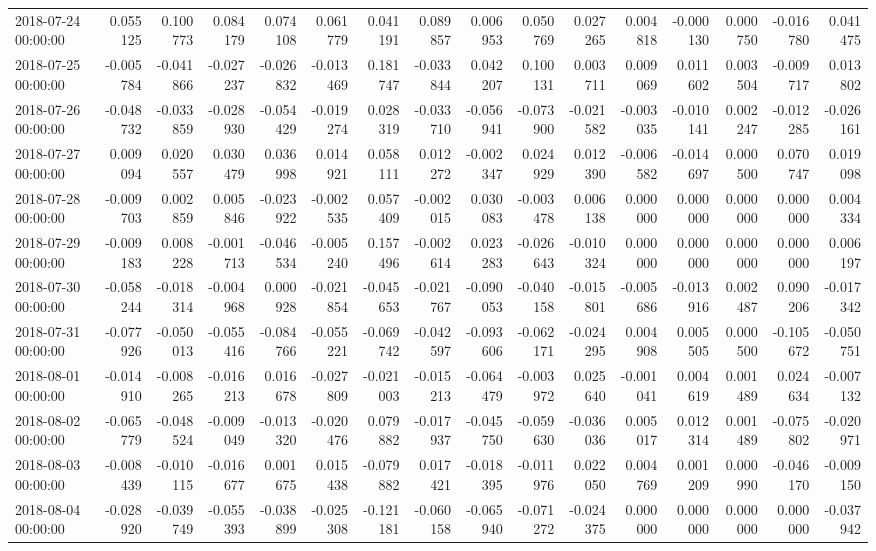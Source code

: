 \begin{tabular}{lrrrrrrrrrrrrrrr}
2018-07-24 00:00:00 & 0.055125 & 0.100773 & 0.084179 & 0.074108 & 0.061779 & 0.041191 & 0.089857 & 0.006953 & 0.050769 & 0.027265 & 0.004818 & -0.000130 & 0.000750 & -0.016780 & 0.041475 \\
2018-07-25 00:00:00 & -0.005784 & -0.041866 & -0.027237 & -0.026832 & -0.013469 & 0.181747 & -0.033844 & 0.042207 & 0.100131 & 0.003711 & 0.009069 & 0.011602 & 0.003504 & -0.009717 & 0.013802 \\
2018-07-26 00:00:00 & -0.048732 & -0.033859 & -0.028930 & -0.054429 & -0.019274 & 0.028319 & -0.033710 & -0.056941 & -0.073900 & -0.021582 & -0.003035 & -0.010141 & 0.002247 & -0.012285 & -0.026161 \\
2018-07-27 00:00:00 & 0.009094 & 0.020557 & 0.030479 & 0.036998 & 0.014921 & 0.058111 & 0.012272 & -0.002347 & 0.024929 & 0.012390 & -0.006582 & -0.014697 & 0.000500 & 0.070747 & 0.019098 \\
2018-07-28 00:00:00 & -0.009703 & 0.002859 & 0.005846 & -0.023922 & -0.002535 & 0.057409 & -0.002015 & 0.030083 & -0.003478 & 0.006138 & 0.000000 & 0.000000 & 0.000000 & 0.000000 & 0.004334 \\
2018-07-29 00:00:00 & -0.009183 & 0.008228 & -0.001713 & -0.046534 & -0.005240 & 0.157496 & -0.002614 & 0.023283 & -0.026643 & -0.010324 & 0.000000 & 0.000000 & 0.000000 & 0.000000 & 0.006197 \\
2018-07-30 00:00:00 & -0.058244 & -0.018314 & -0.004968 & 0.000928 & -0.021854 & -0.045653 & -0.021767 & -0.090053 & -0.040158 & -0.015801 & -0.005686 & -0.013916 & 0.002487 & 0.090206 & -0.017342 \\
2018-07-31 00:00:00 & -0.077926 & -0.050013 & -0.055416 & -0.084766 & -0.055221 & -0.069742 & -0.042597 & -0.093606 & -0.062171 & -0.024295 & 0.004908 & 0.005505 & 0.000500 & -0.105672 & -0.050751 \\
2018-08-01 00:00:00 & -0.014910 & -0.008265 & -0.016213 & 0.016678 & -0.027809 & -0.021003 & -0.015213 & -0.064479 & -0.003972 & 0.025640 & -0.001041 & 0.004619 & 0.001489 & 0.024634 & -0.007132 \\
2018-08-02 00:00:00 & -0.065779 & -0.048524 & -0.009049 & -0.013320 & -0.020476 & 0.079882 & -0.017937 & -0.045750 & -0.059630 & -0.036036 & 0.005017 & 0.012314 & 0.001489 & -0.075802 & -0.020971 \\
2018-08-03 00:00:00 & -0.008439 & -0.010115 & -0.016677 & 0.001675 & 0.015438 & -0.079882 & 0.017421 & -0.018395 & -0.011976 & 0.022050 & 0.004769 & 0.001209 & 0.000990 & -0.046170 & -0.009150 \\
2018-08-04 00:00:00 & -0.028920 & -0.039749 & -0.055393 & -0.038899 & -0.025308 & -0.121181 & -0.060158 & -0.065940 & -0.071272 & -0.024375 & 0.000000 & 0.000000 & 0.000000 & 0.000000 & -0.037942 \\

\end{tabular}
